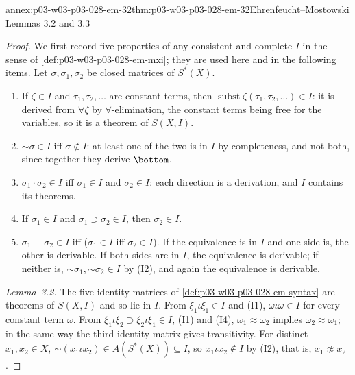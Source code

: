 \begin{annexitem}{annex:p03-w03-p03-028-em-32}{thm:p03-w03-p03-028-em-32}{Ehrenfeucht--Mostowski Lemmas 3.2 and 3.3}
\begin{proof}
We first record five properties of any consistent and complete \(I\) in the
sense of \cref{def:p03-w03-p03-028-em-mxi}; they are used here and in the
following items.  Let \(\sigma,\sigma_1,\sigma_2\) be closed matrices of
\(S^*(X)\).
\begin{enumerate}
\item[(I1)] If \(\zeta\in I\) and \(\tau_1,\tau_2,\ldots\) are constant terms,
then \(\operatorname{subst}\zeta(\tau_1,\tau_2,\ldots)\in I\): it is derived
from \(\forall\zeta\) by \(\forall\)-elimination, the constant terms being
free for the variables, so it is a theorem of \(S(X,I)\).
\item[(I2)] \(\mathord\sim\sigma\in I\) iff \(\sigma\notin I\): at least one of
the two is in \(I\) by completeness, and not both, since together they derive
\(\bottom\).
\item[(I3)] \(\sigma_1\cdot\sigma_2\in I\) iff \(\sigma_1\in I\) and
\(\sigma_2\in I\): each direction is a derivation, and \(I\) contains its
theorems.
\item[(I4)] If \(\sigma_1\in I\) and \(\sigma_1\supset\sigma_2\in I\), then
\(\sigma_2\in I\).
\item[(I5)] \(\sigma_1\equiv\sigma_2\in I\) iff (\(\sigma_1\in I\) iff
\(\sigma_2\in I\)).  If the equivalence is in \(I\) and one side is, the other
is derivable.  If both sides are in \(I\), the equivalence is derivable; if
neither is, \(\mathord\sim\sigma_1,\mathord\sim\sigma_2\in I\) by (I2), and
again the equivalence is derivable.
\end{enumerate}

\emph{Lemma~3.2.}  The five identity matrices of
\cref{def:p03-w03-p03-028-em-syntax} are theorems of \(S(X,I)\) and so lie in
\(I\).  From \(\xi_1\iota\xi_1\in I\) and (I1), \(\omega\iota\omega\in I\) for
every constant term \(\omega\).  From
\(\xi_1\iota\xi_2\supset\xi_2\iota\xi_1\in I\), (I1) and (I4),
\(\omega_1\approx\omega_2\) implies \(\omega_2\approx\omega_1\); in the same
way the third identity matrix gives transitivity.  For distinct
\(x_1,x_2\in X\), \(\mathord\sim(x_1\iota x_2)\in A(S^*(X))\subseteq I\), so
\(x_1\iota x_2\notin I\) by (I2), that is, \(x_1\not\approx x_2\).


\end{proof}
\end{annexitem}
